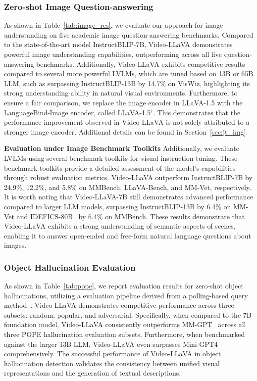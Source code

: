 \subsubsection{Zero-shot Image Question-answering} As shown in Table~\ref{tab:image_res}, we evaluate our approach for image understanding on five academic image question-answering benchmarks. Compared to the state-of-the-art model InstructBLIP-7B, Video-LLaVA demonstrates powerful image understanding capabilities, outperforming across all five question-answering benchmarks. Additionally, Video-LLaVA exhibits competitive results compared to several more powerful LVLMs, which are tuned based on 13B or 65B LLM, such as surpassing InstructBLIP-13B by 14.7\% on VisWiz, highlighting its strong understanding ability in natural visual environments. Furthermore, to ensure a fair comparison, we replace the image encoder in LLaVA-1.5 with the LanguageBind-Image encoder, called LLaVA-1.5$^{\dag}$. This demonstrates that the performance improvement observed in Video-LLaVA is not solely attributed to a stronger image encoder. Additional details can be found in Section~\ref{sec:jt_img}.

\vspace{0.1cm}
\noindent\textbf{Evaluation under Image Benchmark Toolkits} Additionally, we evaluate LVLMs using several benchmark toolkits for visual instruction tuning. These benchmark toolkits provide a detailed assessment of the model's capabilities through robust evaluation metrics. Video-LLaVA outperform InstructBLIP-7B by 24.9\%, 12.2\%, and 5.8\% on MMBench, LLaVA-Bench, and MM-Vet, respectively. It is worth noting that Video-LLaVA-7B still demonstrates advanced performance compared to larger LLM models, surpassing InstructBLIP-13B by 6.4\% on MM-Vet and IDEFICS-80B~\cite{laurencon2023obelics} by 6.4\% on MMBench. These results demonstrate that Video-LLaVA exhibits a strong understanding of semantic aspects of scenes, enabling it to answer open-ended and free-form natural language questions about images.

\subsubsection{Object Hallucination Evaluation} As shown in Table~\ref{tab:pope}, we report evaluation results for zero-shot object hallucinations, utilizing a evaluation pipeline derived from a polling-based query method~\cite{li2023evaluating}. Video-LLaVA demonstrates competitive performance across three subsets: random, popular, and adversarial. Specifically, when compared to the 7B foundation model, Video-LLaVA consistently outperforms MM-GPT~\cite{gong2023multimodal} across all three POPE hallucination evaluation subsets. Furthermore, when benchmarked against the larger 13B LLM, Video-LLaVA even surpasses Mini-GPT4 comprehensively. The successful performance of Video-LLaVA in object hallucination detection validates the consistency between unified visual representations and the generation of textual descriptions.

